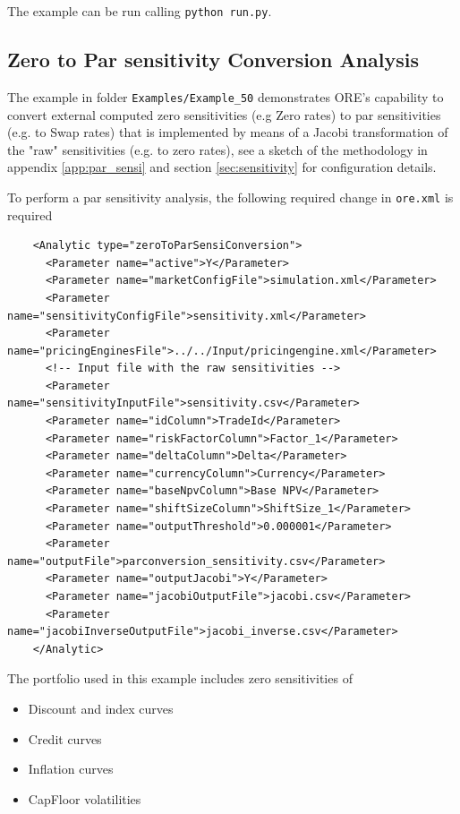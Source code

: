 \documentclass[12pt, a4paper]{article}
\begin{document}
The example can be run calling {\tt python run.py}.


\subsection{Zero to Par sensitivity Conversion Analysis}%
\label{example:50}

The example in folder {\tt Examples/Example\_50} demonstrates ORE's capability to convert external computed zero sensitivities (e.g Zero rates) to par sensitivities (e.g. to Swap rates) 
that is implemented  by means of a Jacobi transformation of the "raw" sensitivities (e.g. to zero rates), see a sketch of the 
methodology in appendix \ref{app:par_sensi} and section \ref{sec:sensitivity} for configuration details.

To perform a par sensitivity analysis, the following required change in {\tt ore.xml} is required

\begin{verbatim}
    <Analytic type="zeroToParSensiConversion">
      <Parameter name="active">Y</Parameter>
      <Parameter name="marketConfigFile">simulation.xml</Parameter>
      <Parameter name="sensitivityConfigFile">sensitivity.xml</Parameter>
      <Parameter name="pricingEnginesFile">../../Input/pricingengine.xml</Parameter>
	  <!-- Input file with the raw sensitivities -->
      <Parameter name="sensitivityInputFile">sensitivity.csv</Parameter>
      <Parameter name="idColumn">TradeId</Parameter>
      <Parameter name="riskFactorColumn">Factor_1</Parameter>
      <Parameter name="deltaColumn">Delta</Parameter>
	  <Parameter name="currencyColumn">Currency</Parameter>
	  <Parameter name="baseNpvColumn">Base NPV</Parameter>
 	  <Parameter name="shiftSizeColumn">ShiftSize_1</Parameter>
      <Parameter name="outputThreshold">0.000001</Parameter>
      <Parameter name="outputFile">parconversion_sensitivity.csv</Parameter>
      <Parameter name="outputJacobi">Y</Parameter>
      <Parameter name="jacobiOutputFile">jacobi.csv</Parameter>
      <Parameter name="jacobiInverseOutputFile">jacobi_inverse.csv</Parameter>
    </Analytic>
\end{verbatim}

The portfolio used in this example includes zero sensitivities of 
\begin{itemize}
\item Discount and index curves
\item Credit curves
\item Inflation curves
\item CapFloor volatilities
\end{itemize}
\end{document}
